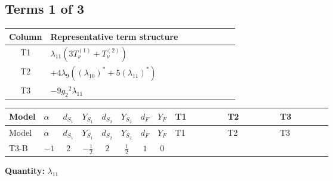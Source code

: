 \documentclass[8pt]{article}
\begin{document}
\begin{landscape}
\subsection*{Terms 1 of 3}
\begin{center}
\begin{tabular}{@{}c >{\raggedright\arraybackslash}p{0.82\linewidth}@{}}
\toprule
Column & Representative term structure \\
\midrule
T1 & \(\displaystyle {\lambda_{11}} (3 T_{\nu}^{(1)}+T_{\nu}^{(2)})\) \\
\midrule
T2 & \(\displaystyle +4 {\lambda_{9}} (\left({\lambda_{10}}\right)^{*}+5 \left({\lambda_{11}}\right)^{*})\) \\
\midrule
T3 & \(\displaystyle -9 {g_2}^2 {\lambda_{11}}\) \\
\midrule
\bottomrule
\end{tabular}
\end{center}
\smallskip
\tiny
\begin{longtable}{@{}llcccccc >{\raggedright\arraybackslash}p{0.21\linewidth} >{\raggedright\arraybackslash}p{0.21\linewidth} >{\raggedright\arraybackslash}p{0.21\linewidth}@{}}
\toprule
Model & $\alpha$ & $d_{S_1}$ & $Y_{S_1}$ & $d_{S_2}$ & $Y_{S_2}$ & $d_F$ & $Y_F$ & T1 & T2 & T3 \\
\midrule
\endfirsthead
\toprule
Model & $\alpha$ & $d_{S_1}$ & $Y_{S_1}$ & $d_{S_2}$ & $Y_{S_2}$ & $d_F$ & $Y_F$ & T1 & T2 & T3 \\
\midrule
\endhead
T3-B & $-1$ & $2$ & $-\frac{1}{2}$ & $2$ & $\frac{1}{2}$ & $1$ & $0$ & \scriptsize\adjustbox{max width=\linewidth}{$\begin{gathered} {\lambda_{11}} (3 T_{\nu}^{(1)}+T_{\nu}^{(2)})\end{gathered}$} & \scriptsize\adjustbox{max width=\linewidth}{$\begin{gathered} +4 {\lambda_{9}} (\left({\lambda_{10}}\right)^{*}+5 \left({\lambda_{11}}\right)^{*})\end{gathered}$} & \scriptsize\adjustbox{max width=\linewidth}{$\begin{gathered} -9 {g_2}^2 {\lambda_{11}}\end{gathered}$} \\
\midrule
\bottomrule
\end{longtable}
\clearpage
\noindent\textbf{Quantity: }$\lambda_{11}$\par\smallskip

\end{landscape}
\end{document}
